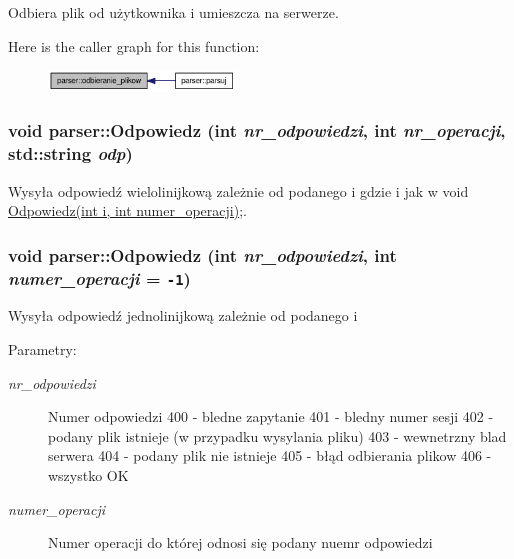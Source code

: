 Odbiera plik od użytkownika i umieszcza na serwerze. 



Here is the caller graph for this function:\nopagebreak
\begin{figure}[H]
\begin{center}
\leavevmode
\includegraphics[width=141pt]{dd/dad/a00005_4e084ae10e8498b171c44a0138597d2e_icgraph}
\end{center}
\end{figure}
\hypertarget{a00005_e45404aec82f8c70a023bdc365c74287}{
\subsubsection[{Odpowiedz}]{\setlength{\rightskip}{0pt plus 5cm}void parser::Odpowiedz (int {\em nr\_\-odpowiedzi}, \/  int {\em nr\_\-operacji}, \/  std::string {\em odp})}}
\label{dd/dad/a00005_e45404aec82f8c70a023bdc365c74287}


Wysyła odpowiedź wielolinijkową zależnie od podanego i gdzie i jak w void \hyperlink{a00005_49d270636d2f3d5376c3cba62b5ea839}{Odpowiedz(int i, int numer\_\-operacji)};. 

\hypertarget{a00005_49d270636d2f3d5376c3cba62b5ea839}{
\subsubsection[{Odpowiedz}]{\setlength{\rightskip}{0pt plus 5cm}void parser::Odpowiedz (int {\em nr\_\-odpowiedzi}, \/  int {\em numer\_\-operacji} = {\tt -1})}}
\label{dd/dad/a00005_49d270636d2f3d5376c3cba62b5ea839}


Wysyła odpowiedź jednolinijkową zależnie od podanego i \begin{Desc}
\item[Parametry:]
\begin{description}
\item[{\em nr\_\-odpowiedzi}]Numer odpowiedzi 400 - bledne zapytanie 401 - bledny numer sesji 402 - podany plik istnieje (w przypadku wysylania pliku) 403 - wewnetrzny blad serwera 404 - podany plik nie istnieje 405 - błąd odbierania plikow 406 - wszystko OK \item[{\em numer\_\-operacji}]Numer operacji do której odnosi się podany nuemr odpowiedzi \end{description}
\end{Desc}


